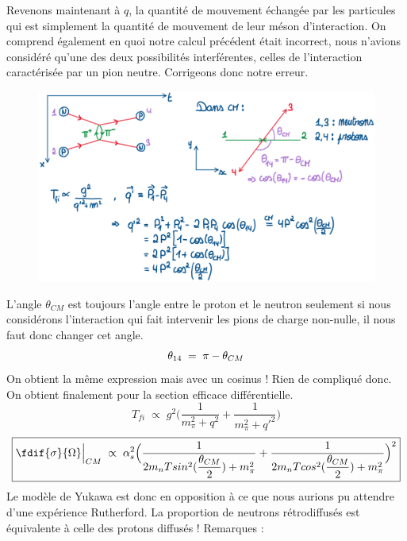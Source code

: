 Revenons maintenant à $q$, la quantité de mouvement échangée par les particules qui est simplement la quantité de mouvement de leur méson d'interaction. On comprend également en quoi notre calcul précédent était incorrect, nous n'avions considéré qu'une des deux possibilités interférentes, celles de l'interaction caractérisée par un pion neutre. Corrigeons donc notre erreur.\\
\begin{figure}[H]
    \centering
    \includegraphics[scale = 0.4]{Images4/Feynmann_pi2.png}
\end{figure}
L'angle $\theta_{CM}$ est toujours l'angle entre le proton et le neutron seulement si nous considérons l'interaction qui fait intervenir les pions de charge non-nulle, il nous faut donc changer cet angle.
\begin{equation*}
    \theta_{14} \; = \; \pi - \theta_{CM}
\end{equation*}
On obtient la même expression mais avec un cosinus ! Rien de compliqué donc. On obtient finalement pour la section efficace différentielle.
\begin{equation*}
    \boxed{
        T_{fi} \; \propto\; g^2 \Big(\dfrac{1}{m_\pi^2 + q^2} + \dfrac{1}{m_\pi^2 + q'^2}\Big)
    }
\end{equation*}
\begin{equation*}
    \boxed{
        \fdif{\sigma}{\Omega}\Big|_{CM} \;\propto\;\alpha_s^2 \Big(\dfrac{1}{2m_n T sin^2(\dfrac{\theta_{CM}}{2})+m^2_\pi} + \dfrac{1}{2m_n T cos^2(\dfrac{\theta_{CM}}{2})+m^2_\pi}\Big)^2
    }
\end{equation*}
Le modèle de Yukawa est donc en opposition à ce que nous aurions pu attendre d'une expérience Rutherford. La proportion de neutrons rétrodiffusés est équivalente à celle des protons diffusés !
Remarques :
